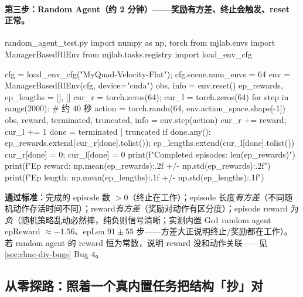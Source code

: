 
\paragraph{第三步：Random Agent（约 2 分钟）——奖励有方差、终止会触发、reset 正常。}

\begin{codebox}[Python]{random\_agent\_test.py}
import numpy as np, torch
from mjlab.envs import ManagerBasedRlEnv
from mjlab.tasks.registry import load_env_cfg

cfg = load_env_cfg("MyQuad-Velocity-Flat"); cfg.scene.num_envs = 64
env = ManagerBasedRlEnv(cfg, device="cuda")
obs, info = env.reset()
ep_rewards, ep_lengths = [], []
cur_r = torch.zeros(64); cur_l = torch.zeros(64)
for step in range(2000):                       # 约 40 秒
    action = torch.randn(64, env.action_space.shape[-1])
    obs, reward, terminated, truncated, info = env.step(action)
    cur_r += reward; cur_l += 1
    done = terminated | truncated
    if done.any():
        ep_rewards.extend(cur_r[done].tolist()); ep_lengths.extend(cur_l[done].tolist())
        cur_r[done] = 0; cur_l[done] = 0
print(f"Completed episodes: {len(ep_rewards)}")
print(f"Ep reward: {np.mean(ep_rewards):.2f} +/- {np.std(ep_rewards):.2f}")
print(f"Ep length: {np.mean(ep_lengths):.1f} +/- {np.std(ep_lengths):.1f}")
\end{codebox}

\textbf{通过标准}：完成的 episode 数 $>0$（终止在工作）；episode 长度\emph{有方差}（不同随机动作存活时间不同）；reward\emph{有方差}（奖励对动作有区分度）；episode reward 为\emph{负}（随机策略乱动必然摔，纯负则信号清晰；实测内置 Go1 random agent epReward $\approx -1.56$、epLen $91\pm 55$ 步——方差大正说明终止/奖励都在工作）。若 random agent 的 reward 恒为常数，说明 reward 没和动作关联——见 \cref{sec:rlmc-diy-bugs} Bug 4。

\subsection{从零探路：照着一个真内置任务把结构「抄」对}
\label{sec:rlmc-diy-explore}

